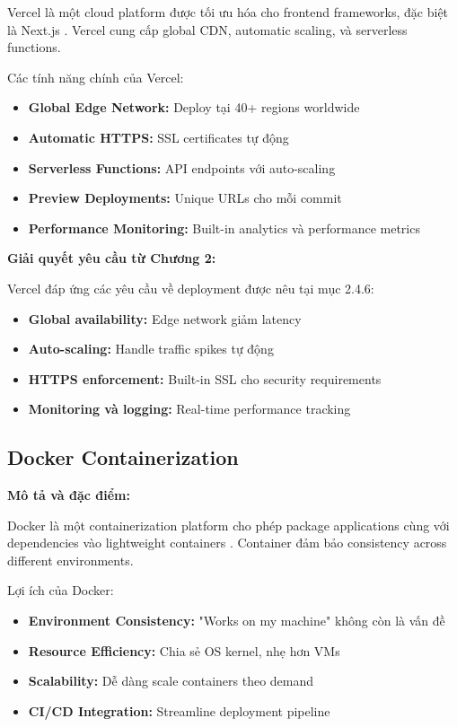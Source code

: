 \documentclass[../DoAn.tex]{subfiles}
\begin{document}
Vercel là một cloud platform được tối ưu hóa cho frontend frameworks, đặc biệt là Next.js \cite{vercel}. Vercel cung cấp global CDN, automatic scaling, và serverless functions.

Các tính năng chính của Vercel:
\begin{itemize}
    \item \textbf{Global Edge Network:} Deploy tại 40+ regions worldwide
    \item \textbf{Automatic HTTPS:} SSL certificates tự động
    \item \textbf{Serverless Functions:} API endpoints với auto-scaling
    \item \textbf{Preview Deployments:} Unique URLs cho mỗi commit
    \item \textbf{Performance Monitoring:} Built-in analytics và performance metrics
\end{itemize}

\textbf{Giải quyết yêu cầu từ Chương 2:}

Vercel đáp ứng các yêu cầu về deployment được nêu tại mục 2.4.6:
\begin{itemize}
    \item \textbf{Global availability:} Edge network giảm latency
    \item \textbf{Auto-scaling:} Handle traffic spikes tự động
    \item \textbf{HTTPS enforcement:} Built-in SSL cho security requirements
    \item \textbf{Monitoring và logging:} Real-time performance tracking
\end{itemize}

\subsection{Docker Containerization}
\label{subsection:3.7.2}

\textbf{Mô tả và đặc điểm:}

Docker là một containerization platform cho phép package applications cùng với dependencies vào lightweight containers \cite{docker}. Container đảm bảo consistency across different environments.

Lợi ích của Docker:
\begin{itemize}
    \item \textbf{Environment Consistency:} "Works on my machine" không còn là vấn đề
    \item \textbf{Resource Efficiency:} Chia sẻ OS kernel, nhẹ hơn VMs
    \item \textbf{Scalability:} Dễ dàng scale containers theo demand
    \item \textbf{CI/CD Integration:} Streamline deployment pipeline
\end{itemize}
\end{document}

